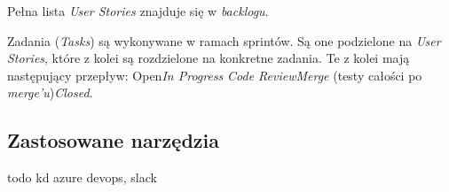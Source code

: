 \documentclass[10pt, titlepage, oneside, a4paper]{article}
\begin{document}
	Pełna lista \textit{User Stories} znajduje się w \textit{backlogu}.

	Zadania (\textit{Tasks}) są wykonywane w ramach sprintów. Są one podzielone na \textit{User Stories}, które z kolei są rozdzielone na konkretne zadania. Te z kolei mają następujący przepływ: Open\textrightarrow \textit{In Progress} \textrightarrow \textit{Code Review}\textrightarrow \textit{Merge} (testy całości po \textit{merge'u})\textrightarrow \textit{Closed}.
	
	\subsection{Zastosowane narzędzia}
	todo kd azure devops, slack
 
\end{document}
